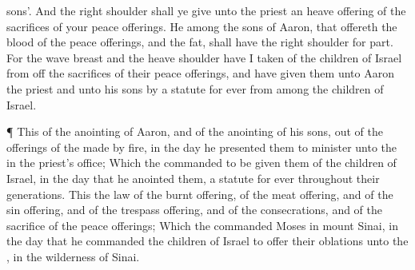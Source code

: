 {sons’.
And the
right
shoulder shall ye
give unto the
priest
{} an heave
offering of the
sacrifices of your peace
offerings.
He among the
sons of
Aaron, that
offereth the
blood of the peace
offerings, and the
fat, shall have the
right
shoulder for
{}
part.
For the
wave
breast and the
heave
shoulder have I
taken of the
children of
Israel from off the
sacrifices of their peace
offerings, and have
given them unto
Aaron the
priest and unto his
sons by a
statute for
ever from among the
children of
Israel.
\par }{\PP {}¶ This
{} of the
anointing of
Aaron, and of the
anointing of his
sons, out of the
offerings of the
{} made by
fire, in the
day
{} he
presented them to minister unto the
{} in the
priest’s office;
Which the
{}
commanded to be
given them of the
children of
Israel, in the
day that he
anointed them,
{} a
statute for
ever throughout their
generations.
This
{} the
law of the burnt
offering, of the meat
offering, and of the sin
offering, and of the trespass
offering, and of the
consecrations, and of the
sacrifice of the peace
offerings;
Which the
{}
commanded
Moses in
mount
Sinai, in the
day that he
commanded the
children of
Israel to
offer their
oblations unto the
{}, in the
wilderness of
Sinai.

}
